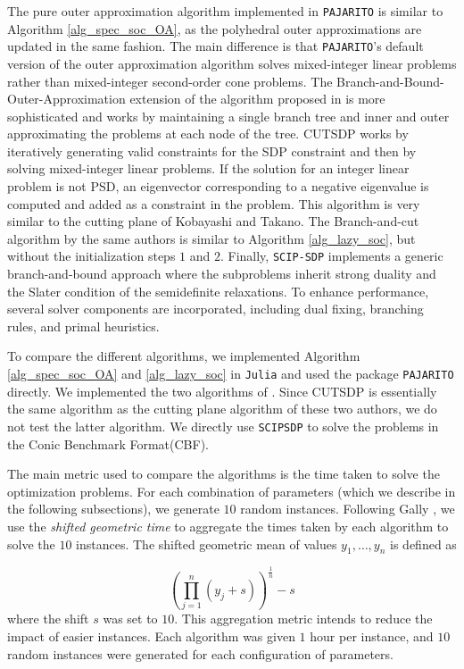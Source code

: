 \documentclass{article}
\begin{document}
The pure outer approximation algorithm implemented in \texttt{PAJARITO} is similar to Algorithm \ref{alg_spec_soc_OA}, as the polyhedral outer approximations are updated in the same fashion. The main difference is that \texttt{PAJARITO}'s default version of the outer approximation algorithm solves mixed-integer linear problems rather than mixed-integer second-order cone problems. The Branch-and-Bound-Outer-Approximation extension of the algorithm proposed in \cite{coey2020outer} is more sophisticated and works by maintaining a single branch tree and inner and outer approximating the problems at each node of the tree. CUTSDP works by iteratively generating valid constraints for the SDP constraint and then by solving mixed-integer linear problems. If the solution for an integer linear problem is not PSD, an eigenvector corresponding to a negative eigenvalue is computed and added as a constraint in the problem. This algorithm is very similar to the cutting plane of Kobayashi and Takano. The Branch-and-cut algorithm by the same authors is similar to Algorithm \ref{alg_lazy_soc}, but without the initialization steps $1$ and $2$. Finally, \texttt{SCIP-SDP} implements a generic branch-and-bound approach where the subproblems inherit strong duality and the Slater condition of the semidefinite relaxations. To enhance performance, several solver components are incorporated, including dual fixing, branching rules, and primal heuristics.

To compare the different algorithms, we implemented Algorithm \ref{alg_spec_soc_OA} and \ref{alg_lazy_soc} in \texttt{Julia} and used the package \texttt{PAJARITO} directly. We implemented the two algorithms of \cite{kobayashi2020branch}. Since CUTSDP is essentially the same algorithm as the cutting plane algorithm of these two authors, we do not test the latter algorithm. We directly use \texttt{SCIPSDP} to solve the problems in the Conic Benchmark Format(CBF).


The main metric used to compare the algorithms is the time taken to solve the optimization problems. For each combination of parameters (which we describe in the following subsections), we generate $10$ random instances. Following Gally \cite{gally2018framework}, we use the \emph{shifted geometric time} to aggregate the times taken by each algorithm to solve the $10$ instances. The shifted geometric mean of values $y_1,\dots,y_n$ is defined as 

\[
\left (\prod_{j=1}^n(y_j+s)\right ) ^{\frac{1}{n}}-s
\]
where the shift $s$ was set to $10$. This aggregation metric intends to reduce the impact of easier instances. Each algorithm was given $1$ hour per instance, and $10$ random instances were generated for each configuration of parameters.
\end{document}

